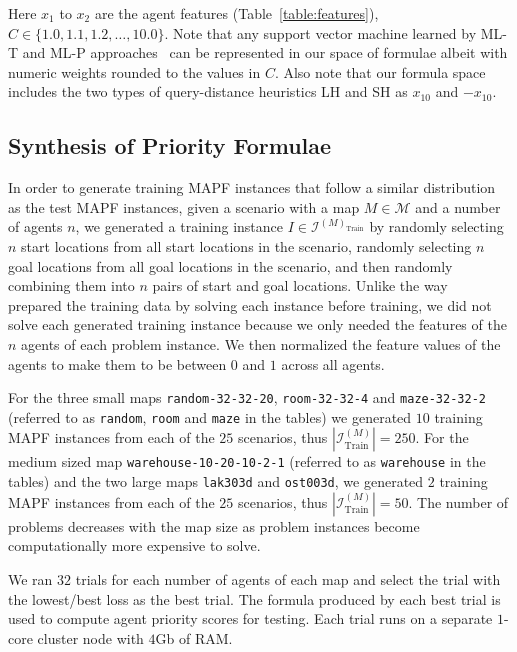Here $ x_1 $ to $ x_{2} $ are the agent features (Table~\ref{table:features}), $ C \in \{1.0, 1.1, 1.2, \dots, 10.0\} $. Note that any support vector machine learned by ML-T and ML-P approaches~\citep{zhang2022learning} can be represented in our space of formulae albeit with numeric weights rounded to the values in $ C $. Also note that our formula space includes the two types of query-distance heuristics LH and SH as $ x_{10} $ and $ -x_{10} $.

\subsection{Synthesis of Priority Formulae}
\label{synth_pf}

In order to generate training MAPF instances that follow a similar distribution as the test MAPF instances, given a scenario with a map $ M \in \mathcal{M} $ and a number of agents $ n $, we generated a training instance $ I \in \mathcal{I}^{(M)_{\text{Train}}} $ by randomly selecting $ n $ start locations from all start locations in the scenario, randomly selecting $ n $ goal locations from all goal locations in the scenario, and then randomly combining them into $ n $ pairs of start and goal locations. Unlike the way~\citet{zhang2022learning} prepared the training data by solving each instance before training, we did not solve each generated training instance because we only needed the features of the $ n $ agents of each problem instance. We then normalized the feature values of the agents to make them to be between $ 0 $ and $ 1 $ across all agents.

For the three small maps {\tt random-32-32-20}, {\tt room-32-32-4} and {\tt maze-32-32-2} (referred to as {\tt random}, {\tt room} and {\tt maze} in the tables) we generated $ 10 $ training MAPF instances from each of the $ 25 $ scenarios, thus $ |\mathcal{I}^{(M)}_{\text{Train}}| = 250 $. For the medium sized map {\tt warehouse-10-20-10-2-1} (referred to as {\tt warehouse} in the tables) and the two large maps {\tt lak303d} and {\tt ost003d}, we generated $ 2 $ training MAPF instances from each of the $ 25 $ scenarios, thus $ |\mathcal{I}^{(M)}_{\text{Train}}| = 50 $. The number of problems decreases with the map size as problem instances become computationally more expensive to solve.

We ran $ 32 $ trials for each number of agents of each map and select the trial with the lowest/best loss as the best trial. The formula produced by each best trial is used to compute agent priority scores for testing. Each trial runs on a separate $ 1 $-core cluster node with $ 4 $Gb of RAM.

